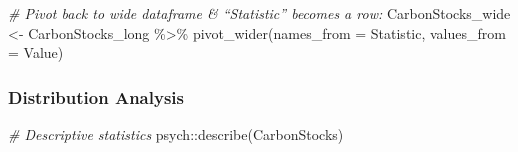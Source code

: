 \documentclass[
]{article}
\newenvironment{Shaded}{}{}
\newcommand{\AttributeTok}[1]{\textcolor[rgb]{0.49,0.56,0.16}{#1}}
\newcommand{\CommentTok}[1]{\textcolor[rgb]{0.38,0.63,0.69}{\textit{#1}}}
\newcommand{\FunctionTok}[1]{\textcolor[rgb]{0.02,0.16,0.49}{#1}}
\newcommand{\NormalTok}[1]{#1}
\newcommand{\OtherTok}[1]{\textcolor[rgb]{0.00,0.44,0.13}{#1}}
\newcommand{\SpecialCharTok}[1]{\textcolor[rgb]{0.25,0.44,0.63}{#1}}
\begin{document}
\begin{Shaded}
\begin{Highlighting}[numbers=left,,]
\CommentTok{\# Pivot back to wide dataframe \& “Statistic” becomes a row:}
\NormalTok{CarbonStocks\_wide }\OtherTok{\textless{}{-}}\NormalTok{ CarbonStocks\_long }\SpecialCharTok{\%\textgreater{}\%}
    \FunctionTok{pivot\_wider}\NormalTok{(}\AttributeTok{names\_from =}\NormalTok{ Statistic, }\AttributeTok{values\_from =}\NormalTok{ Value)}
\end{Highlighting}
\end{Shaded}

\subsubsection{Distribution Analysis}\label{distribution-analysis}

\begin{Shaded}
\begin{Highlighting}[]
\CommentTok{\# Descriptive statistics}
\NormalTok{psych}\SpecialCharTok{::}\FunctionTok{describe}\NormalTok{(CarbonStocks)}
\end{Highlighting}
\end{Shaded}
\end{document}
